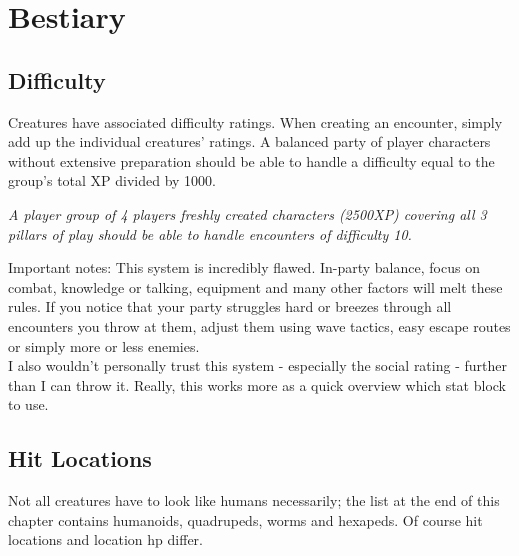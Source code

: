 \documentclass[12pt,a4paper,openany]{book}
\begin{document}
	\chapter{Bestiary}
	\section{Difficulty}
	Creatures have associated difficulty ratings. When creating an encounter, simply add up the individual creatures' ratings. A balanced party of player characters without extensive preparation should be able to handle a difficulty equal to the group's total XP divided by 1000.
	\begin{exampleblock}
		\itshape A player group of 4 players freshly created characters (2500XP) covering all 3 pillars of play should be able to handle encounters of difficulty 10.
	\end{exampleblock}
	Important notes: This system is incredibly flawed. In-party balance, focus on combat, knowledge or talking, equipment and many other factors will melt these rules. If you notice that your party struggles hard or breezes through all encounters you throw at them, adjust them using wave tactics, easy escape routes or simply more or less enemies.\\
	I also wouldn't personally trust this system - especially the social rating - further than I can throw it. Really, this works more as a quick overview which stat block to use.
	
	\section{Hit Locations}
	Not all creatures have to look like humans necessarily; the list at the end of this chapter contains humanoids, quadrupeds, worms and hexapeds. Of course hit locations and location hp differ.
	
\end{document}
